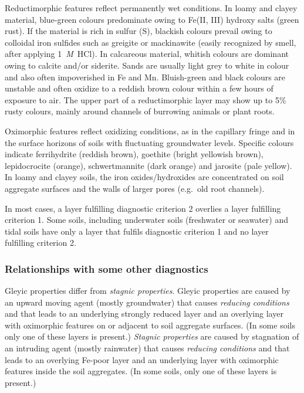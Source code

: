 \documentclass[
  letterpaper,
  DIV=11,
  numbers=noendperiod]{scrreprt}
\begin{document}
Reductimorphic features reflect permanently wet conditions. In loamy and
clayey material, blue-green colours predominate owing to Fe(II, III)
hydroxy salts (green rust). If the material is rich in sulfur (S),
blackish colours prevail owing to colloidal iron sulfides such as
greigite or mackinawite (easily recognized by smell, after applying
1~\emph{M}~HCl). In calcareous material, whitish colours are dominant
owing to calcite and/or siderite. Sands are usually light grey to white
in colour and also often impoverished in Fe and Mn. Bluish-green and
black colours are unstable and often oxidize to a reddish brown colour
within a few hours of exposure to air. The upper part of a
reductimorphic layer may show up to 5\% rusty colours, mainly around
channels of burrowing animals or plant roots.

Oximorphic features reflect oxidizing conditions, as in the capillary
fringe and in the surface horizons of soils with fluctuating groundwater
levels. Specific colours indicate ferrihydrite (reddish brown), goethite
(bright yellowish brown), lepidocrocite (orange), schwertmannite (dark
orange) and jarosite (pale yellow). In loamy and clayey soils, the iron
oxides/hydroxides are concentrated on soil aggregate surfaces and the
walls of larger pores (e.g.~old root channels).

In most cases, a layer fulfilling diagnostic criterion 2 overlies a
layer fulfilling criterion 1. Some soils, including underwater soils
(freshwater or seawater) and tidal soils have only a layer that fulfils
diagnostic criterion 1 and no layer fulfilling criterion 2.

\hypertarget{relationships-with-some-other-diagnostics-42}{%
\subsubsection{Relationships with some other
diagnostics}\label{relationships-with-some-other-diagnostics-42}}

Gleyic properties differ from \emph{stagnic properties}. Gleyic
properties are caused by an upward moving agent (mostly groundwater)
that causes \emph{reducing conditions} and that leads to an underlying
strongly reduced layer and an overlying layer with oximorphic features
on or adjacent to soil aggregate surfaces. (In some soils only one of
these layers is present.) \emph{Stagnic properties} are caused by
stagnation of an intruding agent (mostly rainwater) that causes
\emph{reducing conditions} and that leads to an overlying Fe-poor layer
and an underlying layer with oximorphic features inside the soil
aggregates. (In some soils, only one of these layers is present.)
\end{document}
